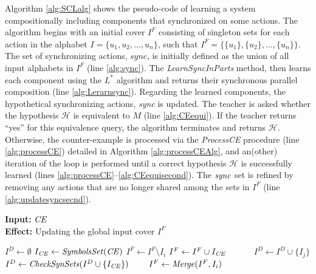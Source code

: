 	Algorithm \ref{alg:SCLalg} shows the pseudo-code of learning a system compositionally including components that synchronized on some actions. The algorithm
begins with an initial cover $I^F$ consisting of singleton sets for each action in the alphabet $I = \{u_1, u_2, \dots, u_n\}$, such that $I^F = \{\{u_1\}, \{u_2\},\dots, \{u_n\}\}$.
The set of synchronizing actions, $\textit{sync}$, is initially defined as the union of all input alphabets in $I^F$ (line \ref{alg:sync}).
The \textit{LearnSyncInParts} method, then learns each component using the $L^*$ algorithm and returns their synchronous parallel composition (line \ref{alg:Lerarnsync}).
Regarding the learned components, the hypothetical synchronizing actions, \textit{sync} is updated. 
The teacher is asked whether the hypothesis $\mathscr{H}$ is equivalent to $M$ (line \ref{alg:CEequi}).
	If the teacher returns ``yes'' for this equivalence query,
 the algorithm terminates and returns $\mathscr{H}$.
 Otherwise, the counter-example is processed via the \textit{ProcessCE} procedure (line \ref{alg:processCE}) detailed in Algorithm \ref{alg:processCEAlg}, and an(other) iteration of the loop is performed until a correct hypothesis $\mathscr{H}$ is successfully learned (lines \ref{alg:processCE}--\ref{alg:CEequisecond}).
   The $\it sync$ set is refined by removing any actions that are no longer shared among the sets in $I^F$ (line \ref{alg:updatesyncsecnd}).

\begin{algorithm}[tb]
		\small
		\caption{Process Counter-Example}
		\label{alg:processCEAlg}
  \hspace*{\algorithmicindent}
		\textbf{Input:}  ${\it CE}$\\
		\hspace*{\algorithmicindent}
		\textbf{Effect:} Updating the global input cover $I^F$
		\begin{algorithmic}[1]
			\State $I^D\leftarrow \emptyset$
            \State $I_{\it CE}\leftarrow {\it SymbolsSet}({\it CE})$ \label{algline:symbolsset}
             {$I^F\leftarrow I^F\setminus I_i$} \label{algline:updateIF}
            \EndIf
            \State $I^F\leftarrow I^F\cup I_{\it CE}$ \label{algline:addICE}
            ~~~~~
            {$I^D\leftarrow I^D\cup \{I_j\}$} \label{algline:generetaeID}
            \EndFor
             {$I^D\leftarrow {\it CheckSynSets}(I^D\cup \{I_{\it CE}\})$} \label{algline:learnsynset}   
            \EndIf
            ~~~ {$I^F\leftarrow {\it Merge}(I^F,I_i)$}\label{algline:merge}
            \EndFor                     
            \label{alg:secondLearn}
			\EndProcedure
			
		\end{algorithmic}
	\end{algorithm}

